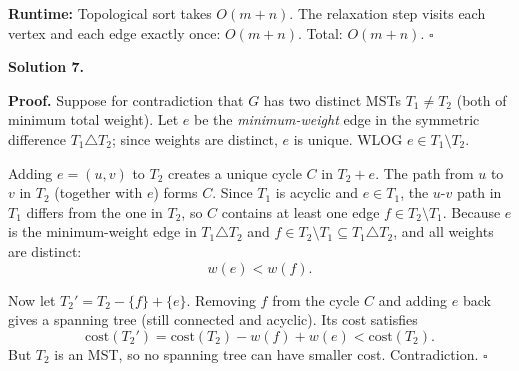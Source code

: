 \documentclass[10pt]{article}
\newcounter{prob}
\begin{document}
\textbf{Runtime:} Topological sort takes $O(m+n)$. The relaxation step visits each vertex and each edge exactly once: $O(m+n)$. Total: $O(m+n)$. $\square$

\bigskip

\noindent\textbf{Solution 7.}\par\smallskip

\textbf{Proof.} Suppose for contradiction that $G$ has two distinct MSTs $T_1 \ne T_2$ (both of minimum total weight). Let $e$ be the \emph{minimum-weight} edge in the symmetric difference $T_1 \triangle T_2$; since weights are distinct, $e$ is unique. WLOG $e \in T_1 \setminus T_2$.

Adding $e = (u,v)$ to $T_2$ creates a unique cycle $C$ in $T_2 + e$. The path from $u$ to $v$ in $T_2$ (together with $e$) forms $C$. Since $T_1$ is acyclic and $e \in T_1$, the $u$-$v$ path in $T_1$ differs from the one in $T_2$, so $C$ contains at least one edge $f \in T_2 \setminus T_1$. Because $e$ is the minimum-weight edge in $T_1 \triangle T_2$ and $f \in T_2 \setminus T_1 \subseteq T_1 \triangle T_2$, and all weights are distinct:
$$w(e) < w(f).$$

Now let $T_2' = T_2 - \{f\} + \{e\}$. Removing $f$ from the cycle $C$ and adding $e$ back gives a spanning tree (still connected and acyclic). Its cost satisfies
$$\mathrm{cost}(T_2') = \mathrm{cost}(T_2) - w(f) + w(e) < \mathrm{cost}(T_2).$$
But $T_2$ is an MST, so no spanning tree can have smaller cost. Contradiction. $\square$
\end{document}
